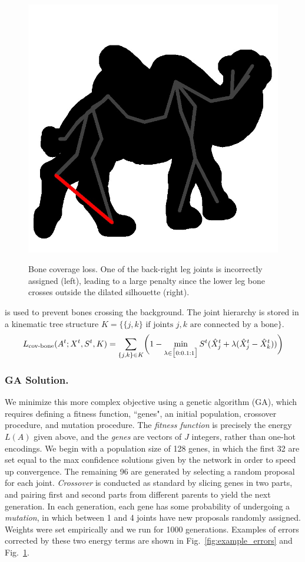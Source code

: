 \begin{figure}[t!]
\begin{floatrow}
{{      \includegraphics[trim={0cm 0cm 0cm 0cm},clip,width=0.45\linewidth]{bone_coverage/bone_error_overlay_cropped.jpg}
      }
  }
  {\caption{Bone coverage loss. One of the back-right leg joints is incorrectly assigned (left), leading to a large penalty since the lower leg bone crosses outside the dilated silhouette (right).}
  \label{fig:cov-bone}
  }
  \end{floatrow}
  \end{figure}
  
   is used to prevent bones crossing the background. The joint hierarchy is stored in a kinematic tree structure $K = \{\{j,k\} \text{ if joints } j, k \text{ are connected by a bone}\}$.
  \begin{equation}
  L_{\text{cov-bone}}(A^{t};X^{t},S^{t},K) = \sum_{\{j,k\} \in K}\biggl(1 - \min_{\lambda \in \big[0:0.1:1\big]}S^{t}(\hat{X}_{j}^{t} + \lambda(\hat{X}_{j}^{t} - \hat{X}_{k}^{t}))\biggr)
  \end{equation}
  
  \begin{figure}[t!]
     
  \end{figure}
  
  \subsubsection*{GA Solution.}
  We minimize this more complex objective using a genetic algorithm (GA)\cite{holland1992adaptation}, which requires defining a fitness function, ``genes", an initial population, crossover procedure, and mutation procedure. 
  The {\em fitness function} is precisely the energy $L(A)$ given above, and the {\em genes} are vectors of $J$ integers, rather than one-hot encodings.
  We begin with a population size of 128 genes, in which the first 32 are set equal to the max confidence solutions given by the network in order to speed up convergence. The remaining 96 are generated by selecting a random proposal for each joint. {\em Crossover} is conducted as standard by slicing genes in two parts, and pairing first and second parts from different parents to yield the next generation. In each generation, each gene has some probability of undergoing a {\em mutation}, in which between 1 and 4 joints have new proposals randomly assigned. Weights were set empirically and we run for 1000 generations.
  Examples of errors corrected by these two energy terms are shown in Fig.~\ref{fig:example_errors} and Fig.~\ref{fig:cov-bone}.
  
